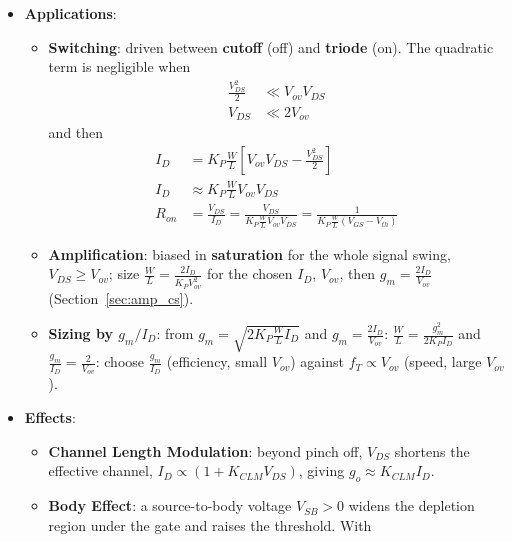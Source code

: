 \begin{itemize}
\begin{table}[H]
\begin{tabular}{|c|c|c|c|}
        Saturation (Amplifier) & \(V_{GS} \geq V_{th}\) & \(V_{DS} \geq V_{ov}\) & \(k_n V_{ov}^2 (1 + K_{CLM} V_{DS})\) \\ \hline
      \end{tabular}
    \end{table}
  \item \textbf{Applications}:
    \begin{itemize}
      \item \textbf{Switching}: driven between \textbf{cutoff} (off) and \textbf{triode} (on). The
        quadratic term is negligible when
        \begin{align*}
          \frac{V_{DS}^2}{2} &\ll V_{ov} V_{DS} \\
          V_{DS} &\ll 2 V_{ov}
        \end{align*}
        and then
        \begin{align*}
          I_D &= K_P \frac{W}{L} \left[ V_{ov} V_{DS} - \frac{V_{DS}^2}{2} \right] \\
          I_D &\approx K_P \frac{W}{L} V_{ov} V_{DS} \\
          R_{on} &= \frac{V_{DS}}{I_D} = \frac{V_{DS}}{K_P \frac{W}{L} V_{ov} V_{DS}} = \frac{1}{K_P \frac{W}{L} (V_{GS} - V_{th})}
        \end{align*}
      \item \textbf{Amplification}: biased in \textbf{saturation} for the whole signal swing,
        \(V_{DS} \geq V_{ov}\); size \(\frac{W}{L} = \frac{2 I_D}{K_P V_{ov}^2}\) for the chosen \(I_D\), \(V_{ov}\),
        then \(g_m = \frac{2 I_D}{V_{ov}}\) (Section~\ref{sec:amp_cs}).
      \item \textbf{Sizing by \(g_m/I_D\)}: from \(g_m = \sqrt{2K_P\frac{W}{L}I_D}\) and \(g_m = \frac{2I_D}{V_{ov}}\):
        \(\frac{W}{L} = \frac{g_m^2}{2K_P I_D}\) and \(\frac{g_m}{I_D} = \frac{2}{V_{ov}}\): choose \(\frac{g_m}{I_D}\) (efficiency, small \(V_{ov}\)) against
        \(f_T \propto V_{ov}\) (speed, large \(V_{ov}\)).
    \end{itemize}
  \item \textbf{Effects}:
    \begin{itemize}
      \item \textbf{Channel Length Modulation}: beyond pinch off, \(V_{DS}\) shortens the effective
        channel, \(I_D \propto (1 + K_{CLM} V_{DS})\), giving \(g_o \approx K_{CLM} I_D\).
      \item \textbf{Body Effect}: a source-to-body voltage \(V_{SB} > 0\) widens
        the depletion region under the gate and raises the threshold. With

\end{itemize}
\end{itemize}
